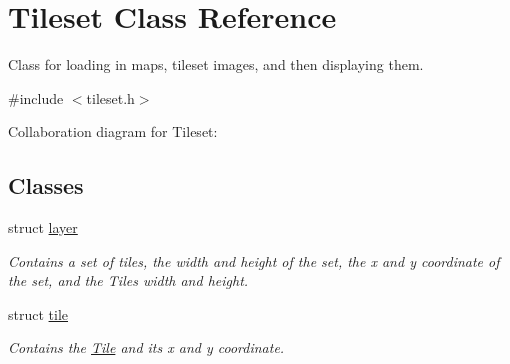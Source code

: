 \hypertarget{classTileset}{}\section{Tileset Class Reference}
\label{classTileset}


Class for loading in maps, tileset images, and then displaying them.  




{\ttfamily \#include $<$tileset.\+h$>$}



Collaboration diagram for Tileset\+:
\subsection*{Classes}
\begin{DoxyCompactItemize}
\item 
struct \hyperlink{structTileset_1_1layer}{layer}
\begin{DoxyCompactList}\small\item\em Contains a set of tiles, the width and height of the set, the x and y coordinate of the set, and the Tiles width and height. \end{DoxyCompactList}\item 
struct \hyperlink{structTileset_1_1tile}{tile}
\begin{DoxyCompactList}\small\item\em Contains the \hyperlink{classTile}{Tile} and its x and y coordinate. \end{DoxyCompactList}\end{DoxyCompactItemize}
